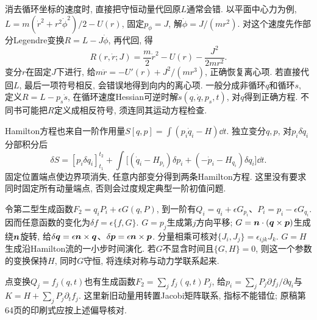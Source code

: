 消去循环坐标的速度时, 直接把守恒动量代回原$L$通常会错. 以平面中心力为例, $L=m(\dot r^2+r^2\dot\phi^2)/2-U(r)$, 固定$p_\phi=J$, 解$\dot\phi=J/(mr^2)$. 对这个速度先作部分Legendre变换$R=L-J\dot\phi$, 再代回, 得
\[
R(r,\dot r;J)=\frac m2\dot r^2-U(r)-\frac{J^2}{2mr^2}.
\]
变分$r$在固定$J$下进行, 给$m\ddot r=-U'(r)+J^2/(mr^3)$, 正确恢复离心项. 若直接代回$L$, 最后一项符号相反, 会错误地得到向内的离心项. 一般分成非循环$q$和循环$s$, 定义$R=L-p_s\dot s$, 在循环速度Hessian可逆时解$\dot s(q,\dot q,p_s,t)$, 对$q$得到正确方程. 不同书可能把$R$定义成相反符号, 须连同其运动方程检查.

Hamilton方程也来自一阶作用量$S[q,p]=\int(p_i\dot q_i-H)\dd t$. 独立变分$q,p$, 对$p_i\delta\dot q_i$分部积分后
\[
\delta S=[p_i\delta q_i]_{t_1}^{t_2}
+\int\bigl[(\dot q_i-H_{p_i})\delta p_i
 +(-\dot p_i-H_{q_i})\delta q_i\bigr]\dd t.
\]
固定位置端点使边界项消失, 任意内部变分得到两条Hamilton方程. 这里没有要求同时固定所有动量端点, 否则会过度规定典型一阶初值问题.

令第二型生成函数$F_2=q_iP_i+\epsilon G(q,P)$, 到一阶有$Q_i=q_i+\epsilon G_{p_i}$、$P_i=p_i-\epsilon G_{q_i}$. 因而任意函数的变化为$\delta f=\epsilon\{f,G\}$. $G=p_j$生成第$j$方向平移; $G=\boldsymbol{n}\cdot(\boldsymbol{q}\times\boldsymbol{p})$生成绕$\boldsymbol{n}$旋转, 给$\delta\boldsymbol{q}=\epsilon\boldsymbol{n}\times\boldsymbol{q}$、$\delta\boldsymbol{p}=\epsilon\boldsymbol{n}\times\boldsymbol{p}$. 分量相乘可核对$\{J_i,J_j\}=\epsilon_{ijk}J_k$. $G=H$生成沿Hamilton流的一小步时间演化. 若$G$不显含时间且$\{G,H\}=0$, 则这一个参数的变换保持$H$, 同时$G$守恒, 将连续对称与动力学联系起来.

点变换$Q_j=f_j(q,t)$也有生成函数$F_2=\sum_jf_j(q,t)P_j$, 给$p_i=\sum_jP_j\partial f_j/\partial q_i$与$K=H+\sum_jP_j\partial_tf_j$. 这里新旧动量用转置Jacobi矩阵联系, 指标不能错位; 原稿第64页的印刷式应按上述偏导核对.
